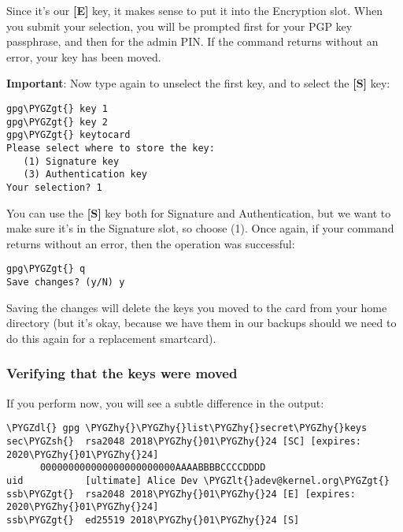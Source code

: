 \documentclass[a4paper,8pt,english]{sphinxmanual}
\def\PYGZlt{\char`\<}
\def\PYGZgt{\char`\>}
\def\PYGZsh{\char`\#}
\def\PYGZdl{\char`\$}
\def\PYGZhy{\char`\-}
\begin{document}
Since it's our \textbf{{[}E{]}} key, it makes sense to put it into the Encryption
slot.  When you submit your selection, you will be prompted first for
your PGP key passphrase, and then for the admin PIN. If the command
returns without an error, your key has been moved.

\textbf{Important}: Now type  again to unselect the first key, and
 to select the \textbf{{[}S{]}} key:

\begin{Verbatim}[commandchars=\\\{\}]
gpg\PYGZgt{} key 1
gpg\PYGZgt{} key 2
gpg\PYGZgt{} keytocard
Please select where to store the key:
   (1) Signature key
   (3) Authentication key
Your selection? 1
\end{Verbatim}

You can use the \textbf{{[}S{]}} key both for Signature and Authentication, but
we want to make sure it's in the Signature slot, so choose (1). Once
again, if your command returns without an error, then the operation was
successful:

\begin{Verbatim}[commandchars=\\\{\}]
gpg\PYGZgt{} q
Save changes? (y/N) y
\end{Verbatim}

Saving the changes will delete the keys you moved to the card from your
home directory (but it's okay, because we have them in our backups
should we need to do this again for a replacement smartcard).


\subsubsection{Verifying that the keys were moved}
\label{process/maintainer-pgp-guide:verifying-that-the-keys-were-moved}
If you perform  now, you will see a subtle
difference in the output:

\begin{Verbatim}[commandchars=\\\{\}]
\PYGZdl{} gpg \PYGZhy{}\PYGZhy{}list\PYGZhy{}secret\PYGZhy{}keys
sec\PYGZsh{}  rsa2048 2018\PYGZhy{}01\PYGZhy{}24 [SC] [expires: 2020\PYGZhy{}01\PYGZhy{}24]
      000000000000000000000000AAAABBBBCCCCDDDD
uid           [ultimate] Alice Dev \PYGZlt{}adev@kernel.org\PYGZgt{}
ssb\PYGZgt{}  rsa2048 2018\PYGZhy{}01\PYGZhy{}24 [E] [expires: 2020\PYGZhy{}01\PYGZhy{}24]
ssb\PYGZgt{}  ed25519 2018\PYGZhy{}01\PYGZhy{}24 [S]
\end{Verbatim}
\end{document}
